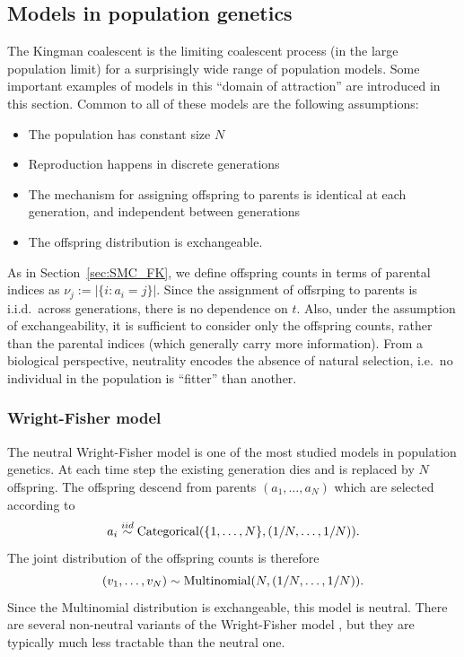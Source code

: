 \subsection{Models in population genetics}\label{sec:popgenmodels}
The Kingman coalescent is the limiting coalescent process (in the large population limit) for a surprisingly wide range of population models. Some important examples of models in this ``domain of attraction'' are introduced in this section.
Common to all of these models are the following assumptions:
\begin{itemize}
\item The population has constant size $N$
\item Reproduction happens in discrete generations
\item The mechanism for assigning offspring to parents is identical at each generation, and independent between generations
\item The offspring distribution is exchangeable.
\end{itemize}
As in Section~\ref{sec:SMC_FK}, we define offspring counts in terms of parental indices as $\nu_j := |\{ i: a_i = j\}|$.
Since the assignment of offsrping to parents is i.i.d.\ across generations, there is no dependence on $t$.
Also, under the assumption of exchangeability, it is sufficient to consider only the offspring counts, rather than the parental indices (which generally carry more information).
From a biological perspective, neutrality encodes the absence of natural selection, i.e.\ no individual in the population is ``fitter'' than another.

\subsubsection{Wright-Fisher model}
The neutral Wright-Fisher model \parencite{fisher1923, fisher1930, wright1931} is one of the most studied models in population genetics.
At each time step the existing generation dies and is replaced by $N$ offspring. The offspring descend from parents $(a_1, \dots, a_N)$ which are selected according to
\begin{equation*}
a_i \overset{iid}{\sim} \operatorname{Categorical}(\{1, \dots, N\}, (1/N, \dots, 1/N)).
\end{equation*}
The joint distribution of the offspring counts is therefore
\begin{equation*}
(v_1,\dots, v_N) \sim \operatorname{Multinomial}(N, (1/N, \dots, 1/N)).
\end{equation*}
Since the Multinomial distribution is exchangeable, this model is neutral.
There are several non-neutral variants of the Wright-Fisher model , but they are typically much less tractable than the neutral one.


